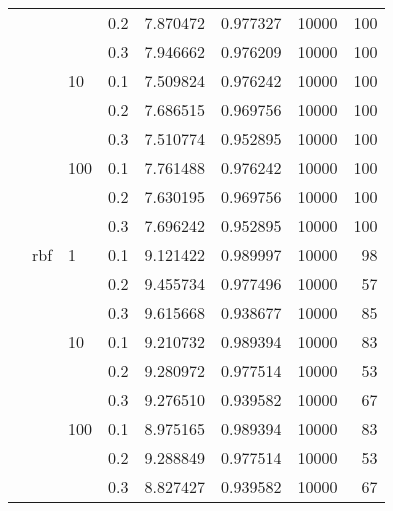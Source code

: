 \begin{table}[H]
\begin{tabular}{llllrrrr}
           &     &     & 0.2 &   7.870472 &  0.977327 &   10000 &   100 \\
           &     &     & 0.3 &   7.946662 &  0.976209 &   10000 &   100 \\
           &     & 10  & 0.1 &   7.509824 &  0.976242 &   10000 &   100 \\
           &     &     & 0.2 &   7.686515 &  0.969756 &   10000 &   100 \\
           &     &     & 0.3 &   7.510774 &  0.952895 &   10000 &   100 \\
           &     & 100 & 0.1 &   7.761488 &  0.976242 &   10000 &   100 \\
           &     &     & 0.2 &   7.630195 &  0.969756 &   10000 &   100 \\
           &     &     & 0.3 &   7.696242 &  0.952895 &   10000 &   100 \\
           & rbf & 1   & 0.1 &   9.121422 &  0.989997 &   10000 &    98 \\
           &     &     & 0.2 &   9.455734 &  0.977496 &   10000 &    57 \\
           &     &     & 0.3 &   9.615668 &  0.938677 &   10000 &    85 \\
           &     & 10  & 0.1 &   9.210732 &  0.989394 &   10000 &    83 \\
           &     &     & 0.2 &   9.280972 &  0.977514 &   10000 &    53 \\
           &     &     & 0.3 &   9.276510 &  0.939582 &   10000 &    67 \\
           &     & 100 & 0.1 &   8.975165 &  0.989394 &   10000 &    83 \\
           &     &     & 0.2 &   9.288849 &  0.977514 &   10000 &    53 \\
           &     &     & 0.3 &   8.827427 &  0.939582 &   10000 &    67 \\
\bottomrule
\end{tabular}
\end{table}
